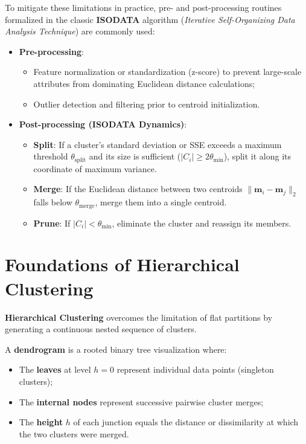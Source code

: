 To mitigate these limitations in practice, pre- and post-processing routines formalized in the classic \textbf{ISODATA} algorithm (\textit{Iterative Self-Organizing Data Analysis Technique}) are commonly used:
\begin{itemize}
    \item \textbf{Pre-processing}:
    \begin{itemize}[noitemsep]
        \item Feature normalization or standardization (z-score) to prevent large-scale attributes from dominating Euclidean distance calculations;
        \item Outlier detection and filtering prior to centroid initialization.
    \end{itemize}
    \item \textbf{Post-processing (ISODATA Dynamics)}:
    \begin{itemize}[noitemsep]
        \item \textbf{Split}: If a cluster's standard deviation or SSE exceeds a maximum threshold $\theta_{\text{split}}$ and its size is sufficient ($|C_i| \ge 2\theta_{\min}$), split it along its coordinate of maximum variance.
        \item \textbf{Merge}: If the Euclidean distance between two centroids $\|\mathbf{m}_i - \mathbf{m}_j\|_2$ falls below $\theta_{\text{merge}}$, merge them into a single centroid.
        \item \textbf{Prune}: If $|C_i| < \theta_{\min}$, eliminate the cluster and reassign its members.
    \end{itemize}
\end{itemize}

\section{Foundations of Hierarchical Clustering}
\label{sec:dm-hierarchical-foundations-dendrogram}

\textbf{Hierarchical Clustering} overcomes the limitation of flat partitions by generating a continuous nested sequence of clusters.

\begin{definition}[Dendrogram]
A \textbf{dendrogram} is a rooted binary tree visualization where:
\begin{itemize}[noitemsep]
    \item The \textbf{leaves} at level $h = 0$ represent individual data points (singleton clusters);
    \item The \textbf{internal nodes} represent successive pairwise cluster merges;
    \item The \textbf{height} $h$ of each junction equals the distance or dissimilarity at which the two clusters were merged.
\end{itemize}
\end{definition}

